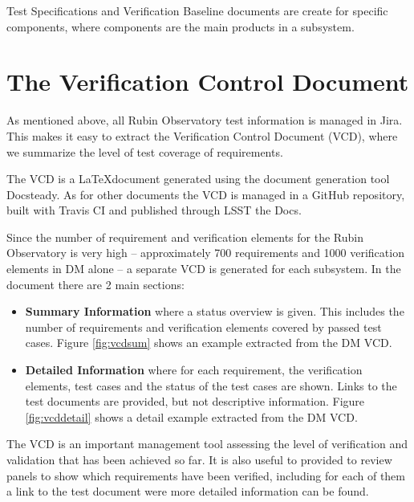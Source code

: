 Test Specifications and Verification Baseline documents are create for specific components, where components are the main products in a subsystem.


\section{The Verification Control Document}

As mentioned above, all Rubin Observatory test information is managed in Jira.
This makes it easy to extract the Verification Control Document (VCD), where we summarize the level of test coverage of requirements.

The VCD is a \LaTeX document generated using the document generation tool Docsteady.
As for other documents the VCD is managed in a GitHub repository, built with Travis CI and published through LSST the Docs.

Since the number of requirement and verification elements for the Rubin Observatory is very high --
approximately 700 requirements and 1000 verification elements in DM alone -- a separate VCD is generated for each subsystem.
In the document there are 2 main sections:

\begin{itemize}
\item \textbf{Summary Information} where a status overview is given.
This includes the number of requirements and verification elements covered by passed test cases.
Figure \ref{fig:vcdsum} shows an example extracted from the DM VCD.
\item \textbf{Detailed Information} where for each requirement, the verification elements, test cases
and the status of the test cases are shown. Links to the test documents are provided, but not descriptive information.
Figure \ref{fig:vcddetail} shows a detail example extracted from the DM VCD.
\end{itemize}

The VCD is an important management tool assessing the  level of verification and validation that has been achieved so far.
 It is also useful to provided to review panels to show which requirements have been verified, 
 including for each of them a link to the test document were more detailed information can be found.

